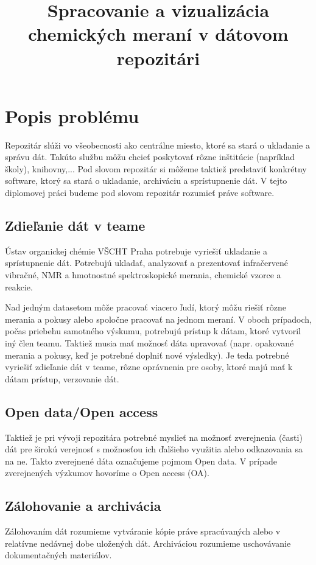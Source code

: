 \documentclass[thesis=M,slovak]{FITthesis}[2013/05/06]
\title{Spracovanie a vizualizácia chemických meraní v dátovom repozitári}
\begin{document}

\begin{introduction}
\end{introduction}

\chapter{Popis problému}
Repozitár slúži vo všeobecnosti ako centrálne miesto, ktoré sa stará o ukladanie a správu dát. Takúto službu môžu chcieť poskytovať rôzne inštitúcie (napríklad školy), knihovny,... Pod slovom repozitár si môžeme taktiež predstaviť konkrétny software, ktorý sa stará o ukladanie, archiváciu a sprístupnenie dát. V tejto diplomovej práci budeme pod slovom repozitár rozumieť práve software.

\section{Zdieľanie dát v teame}
Ústav organickej chémie VŠCHT Praha potrebuje vyriešiť ukladanie a sprístupnenie dát. Potrebujú ukladať, analyzovať a prezentovať infračervené vibračné, NMR a hmotnostné spektroskopické merania, chemické vzorce a reakcie.

Nad jedným datasetom môže pracovať viacero ľudí, ktorý môžu riešiť rôzne merania a pokusy alebo spoločne pracovať na jednom meraní. V oboch prípadoch, počas priebehu samotného výskumu, potrebujú prístup k dátam, ktoré vytvoril iný člen teamu. Taktiež musia mať možnosť dáta upravovať (napr. opakované merania a pokusy, keď je potrebné doplniť nové výsledky). Je teda potrebné vyriešiť zdieľanie dát v teame, rôzne oprávnenia pre osoby, ktoré majú mať k dátam prístup, verzovanie dát.

\section{Open data/Open access}
Taktiež je pri vývoji repozitára potrebné myslieť na možnosť zverejnenia (časti) dát pre širokú verejnosť s možnosťou ich ďalšieho využitia alebo odkazovania sa na ne. Takto zverejnené dáta označujeme pojmom Open data. V prípade zverejnených výzkumov hovoríme o Open access (OA).

\section{Zálohovanie a archivácia}
Zálohovaním dát rozumieme vytváranie kópie práve spracúvaných alebo v relatívne nedávnej dobe uložených dát. Archiváciou rozumieme uschovávanie dokumentačných materiálov.
\end{document}
